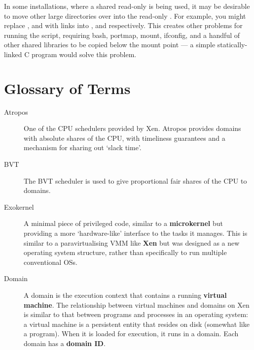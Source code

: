 \documentclass[11pt,twoside,final,openright]{report}
\begin{document}
{In some installations, where a shared read-only {} is
being used, it may be desirable to move other large directories over
into the read-only {}. For example, you might replace
{}, {} and {} with
links into {}, {}
and {} respectively. This creates other
problems for running the {} script, requiring
bash, portmap, mount, ifconfig, and a handful of other shared
libraries to be copied below the mount point --- a simple
statically-linked C program would solve this problem.




\chapter{Glossary of Terms}

\begin{description}
\item[Atropos]             One of the CPU schedulers provided by Xen.
                           Atropos provides domains with absolute shares
                           of the CPU, with timeliness guarantees and a
                           mechanism for sharing out `slack time'.

\item[BVT]                 The BVT scheduler is used to give proportional
                           fair shares of the CPU to domains.

\item[Exokernel]           A minimal piece of privileged code, similar to
                           a {\bf microkernel} but providing a more
                           `hardware-like' interface to the tasks it
                           manages.  This is similar to a paravirtualising
                           VMM like {\bf Xen} but was designed as a new
                           operating system structure, rather than
                           specifically to run multiple conventional OSs.

\item[Domain]              A domain is the execution context that
                           contains a running {\bf virtual machine}.
                           The relationship between virtual machines
                           and domains on Xen is similar to that between
                           programs and processes in an operating
                           system: a virtual machine is a persistent
                           entity that resides on disk (somewhat like
                           a program).  When it is loaded for execution,
                           it runs in a domain.  Each domain has a
                           {\bf domain ID}.


\end{description}}
\end{document}
